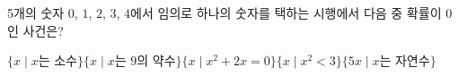 5개의 숫자 $0$, $1$, $2$, $3$, $4$에서 임의로 하나의 숫자를 택하는 시행에서 다음 중 확률이 $0$인 사건은?
\begin{choicesv}{$\{x \mid x$는 소수$\}$}{$\{x \mid x$는 $9$의 약수$\}$}{$\{x \mid x^2+2x=0\}$}{$\{x \mid x^2<3\}$}{$\{5x \mid x$는 자연수$\}$}\end{choicesv}
